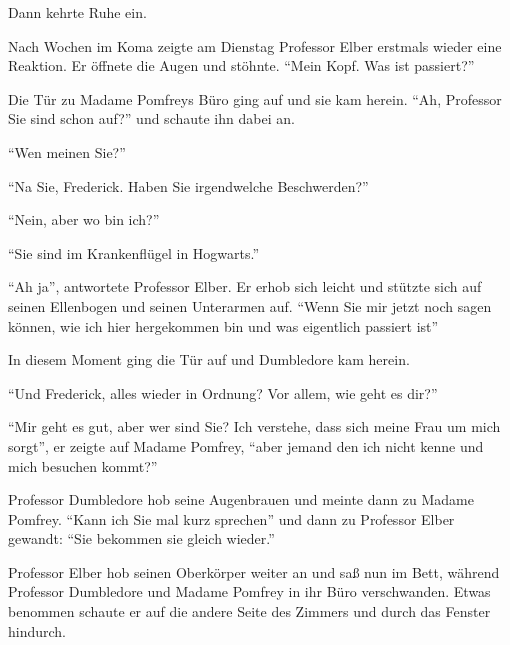 






Dann kehrte Ruhe ein.

\trenn

Nach Wochen im Koma zeigte am Dienstag Professor Elber erstmals wieder eine Reaktion. Er öffnete die Augen und stöhnte. \enquote{Mein Kopf. \gst Was ist passiert?}

Die Tür zu Madame Pomfreys Büro ging auf und sie kam herein. \enquote{Ah, Professor Sie sind schon auf?} und schaute ihn dabei an.

\enquote{Wen meinen Sie?}

\enquote{Na Sie, Frederick. Haben Sie irgendwelche Beschwerden?}

\enquote{Nein, aber \gst wo bin ich?}

\enquote{Sie sind im Krankenflügel in Hogwarts.}

\enquote{Ah ja}, antwortete Professor Elber. Er erhob sich leicht und stützte sich auf seinen Ellenbogen und seinen Unterarmen auf. \enquote{Wenn Sie mir jetzt noch sagen können, wie ich hier hergekommen bin und was eigentlich passiert ist\abs}

In diesem Moment ging die Tür auf und Dumbledore kam herein.

\enquote{Und Frederick, alles wieder in Ordnung? \gst Vor allem, wie geht es dir?}

\enquote{Mir geht es gut, aber wer sind Sie? Ich verstehe, dass sich meine Frau um mich sorgt}, er zeigte auf Madame Pomfrey, \enquote{aber jemand den ich nicht kenne und mich besuchen kommt?}

Professor Dumbledore hob seine Augenbrauen und meinte dann zu Madame Pomfrey. \enquote{Kann ich Sie mal kurz sprechen} und dann zu Professor Elber gewandt: \enquote{Sie bekommen sie gleich wieder.}

Professor Elber hob seinen Oberkörper weiter an und saß nun im Bett, während Professor Dumbledore und Madame Pomfrey in ihr Büro verschwanden. Etwas benommen schaute er auf die andere Seite des Zimmers und durch das Fenster hindurch.

